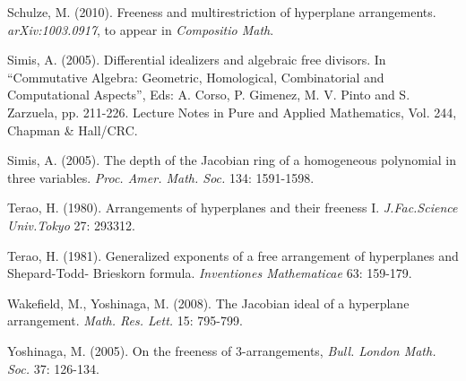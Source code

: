 \documentclass[12pt]{amsart}
\begin{document}
\begin{thebibliography}{10}
 Schulze, M. (2010).
            Freeness and multirestriction of hyperplane arrangements.
            {\em arXiv:1003.0917}, to appear in {\em Compositio Math}.

 Simis, A. (2005).
Differential idealizers and algebraic free divisors.
 In ``Commutative Algebra: Geometric, Homological, Combinatorial and Computational
Aspects'', Eds: A. Corso, P. Gimenez, M. V. Pinto and S. Zarzuela, pp. 211-226. 
Lecture Notes in Pure and Applied Mathematics, Vol. 244, Chapman \& Hall/CRC.

 Simis, A. (2005).
        The depth of the Jacobian ring of a homogeneous polynomial in three variables.
        {\em Proc. Amer. Math. Soc.} 134: 1591-1598.

 Terao, H. (1980).
            Arrangements of hyperplanes and their freeness I.
            {\em J.Fac.Science Univ.Tokyo} 27: 293312.

 Terao, H. (1981).
            Generalized exponents of a free arrangement of hyperplanes and Shepard-Todd-
Brieskorn formula.
            {\em Inventiones Mathematicae} 63: 159-179.

 Wakefield, M., Yoshinaga, M. (2008).
            The Jacobian ideal of a hyperplane arrangement.
            {\em Math. Res. Lett.} 15: 795-799.

 Yoshinaga, M. (2005).
            On the freeness of 3-arrangements,
            {\em Bull. London Math. Soc.} 37: 126-134.

\end{thebibliography}
\end{document}
